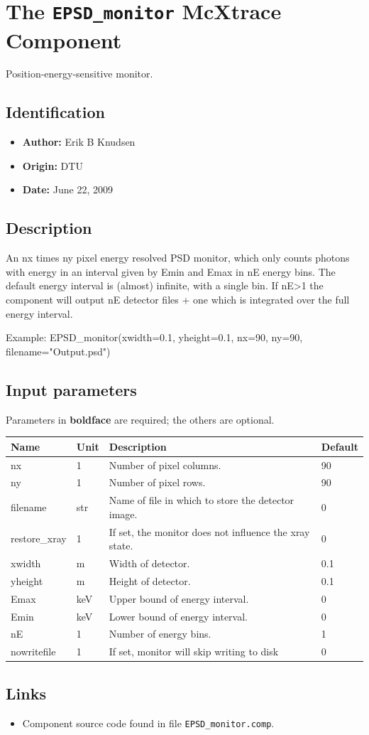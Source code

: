 \section{The \texttt{EPSD\_monitor} McXtrace Component}
Position-energy-sensitive monitor.

\subsection*{Identification}
\begin{itemize}
  \item \textbf{Author:} Erik B Knudsen
  \item \textbf{Origin:} DTU
  \item \textbf{Date:} June 22, 2009
\end{itemize}

\subsection*{Description}
An nx times ny pixel energy resolved PSD monitor, which only counts photons with energy in an interval given by Emin and Emax in nE energy bins. The default energy interval is (almost) infinite, with a single bin. If nE\textgreater{}1 the component will output nE detector files + one which is integrated over the full energy interval.

Example: EPSD\_monitor(xwidth=0.1, yheight=0.1, nx=90, ny=90, filename="Output.psd")

\subsection*{Input parameters}
Parameters in \textbf{boldface} are required; the others are optional.

\begin{longtable}{p{}p{}p{}p{}}
\toprule
\textbf{Name} & \textbf{Unit} & \textbf{Description} & \textbf{Default} \\
\midrule
\endhead
nx & 1 & Number of pixel columns. & 90 \\
ny & 1 & Number of pixel rows. & 90 \\
filename & str & Name of file in which to store the detector image. & 0 \\
restore\_xray & 1 & If set, the monitor does not influence the xray state. & 0 \\
xwidth & m & Width of detector. & 0.1 \\
yheight & m & Height of detector. & 0.1 \\
Emax & keV & Upper bound of energy interval. & 0 \\
Emin & keV & Lower bound of energy interval. & 0 \\
nE & 1 & Number of energy bins. & 1 \\
nowritefile & 1 & If set, monitor will skip writing to disk & 0 \\
\bottomrule
\end{longtable}

\subsection*{Links}
\begin{itemize}
  \item Component source code found in file \texttt{EPSD\_monitor.comp}.
\end{itemize}
